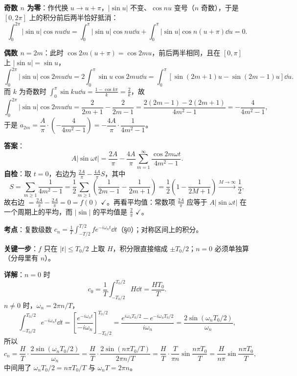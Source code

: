 \documentclass[11pt]{ctexart}
\begin{document}
\textbf{奇数 $n$ 为零}：作代换 $u\to u+\pi$，$|\sin u|$ 不变、$\cos nu$ 变号（$n$ 奇数），于是 $[0,2\pi]$ 上的积分前后两半恰好抵消：
\[ \int_0^{2\pi}|\sin u|\cos nu\dd u=\int_0^{\pi}|\sin u|\cos nu\dd u+\int_0^{\pi}|\sin u|\cos n(u+\pi)\dd u=0 .\]

\textbf{偶数 $n=2m$}：此时 $\cos2m(u+\pi)=\cos2mu$，前后两半相同，且在 $[0,\pi]$ 上 $|\sin u|=\sin u$，
\[
\int_0^{2\pi}|\sin u|\cos2mu\dd u
=2\int_0^{\pi}\sin u\cos2mu\dd u
=\int_0^{\pi}\left[\sin(2m+1)u-\sin(2m-1)u\right]\dd u .
\]
而 $k$ 为奇数时 $\int_0^{\pi}\sin ku\dd u=\frac{1-\cos k\pi}{k}=\frac{2}{k}$，故
\[
\int_0^{2\pi}|\sin u|\cos2mu\dd u=\frac{2}{2m+1}-\frac{2}{2m-1}
=\frac{2(2m-1)-2(2m+1)}{4m^2-1}=-\frac{4}{4m^2-1},
\]
于是 $a_{2m}=\dfrac{A}{\pi}\cdot\left(-\dfrac{4}{4m^2-1}\right)=-\dfrac{4A}{\pi}\cdot\dfrac{1}{4m^2-1}$。

\textbf{答案}：
\[ A|\sin\omega t|=\frac{2A}{\pi}-\frac{4A}{\pi}\sum_{m=1}^{\infty}\frac{\cos2m\omega t}{4m^2-1} .\]
\textbf{自检}：取 $t=0$，右边为 $\frac{2A}{\pi}-\frac{4A}{\pi}S$，其中
\[ S=\sum_{m\ge1}\frac{1}{4m^2-1}=\frac12\sum_{m\ge1}\left(\frac{1}{2m-1}-\frac{1}{2m+1}\right)=\frac12\left(1-\frac{1}{2M+1}\right)\xrightarrow{M\to\infty}\frac12 ,\]
故右边 $=\frac{2A}{\pi}-\frac{2A}{\pi}=0=f(0)$ $\checkmark$。再看平均值：常数项 $\frac{2A}{\pi}$ 应等于 $A|\sin\omega t|$ 在一个周期上的平均，而 $|\sin|$ 的平均值是 $\frac{2}{\pi}$ $\checkmark$。

\qbreak



\textbf{考点}：复数级数 $c_n=\frac1T\int_{-T/2}^{T/2}fe^{-i\omega_nt}\dd t$（§0）；对称区间上的积分。

\textbf{关键一步}：$f$ 只在 $|t|\le T_0/2$ 上取 $H$，积分限直接缩成 $\pm T_0/2$；$n=0$ 必须单独算（分母里有 $n$）。

\textbf{详解}：$n=0$ 时
\[ c_0=\frac1T\int_{-T_0/2}^{T_0/2}H\dd t=\frac{HT_0}{T} .\]
$n\neq0$ 时，$\omega_n=2\pi n/T$，
\[
\int_{-T_0/2}^{T_0/2}e^{-i\omega_nt}\dd t
=\left[\frac{e^{-i\omega_nt}}{-i\omega_n}\right]_{-T_0/2}^{T_0/2}
=\frac{e^{i\omega_nT_0/2}-e^{-i\omega_nT_0/2}}{i\omega_n}
=\frac{2\sin(\omega_nT_0/2)}{\omega_n},
\]
所以
\[
c_n=\frac HT\cdot\frac{2\sin(\omega_nT_0/2)}{\omega_n}
=\frac HT\cdot\frac{2\sin(n\pi T_0/T)}{2\pi n/T}
=\frac HT\cdot\frac{T}{\pi n}\sin\frac{n\pi T_0}{T}
=\frac{H}{n\pi}\sin\frac{n\pi T_0}{T},
\]
中间用了 $\omega_nT_0/2=n\pi T_0/T$ 与 $\omega_nT=2\pi n$。
\end{document}
